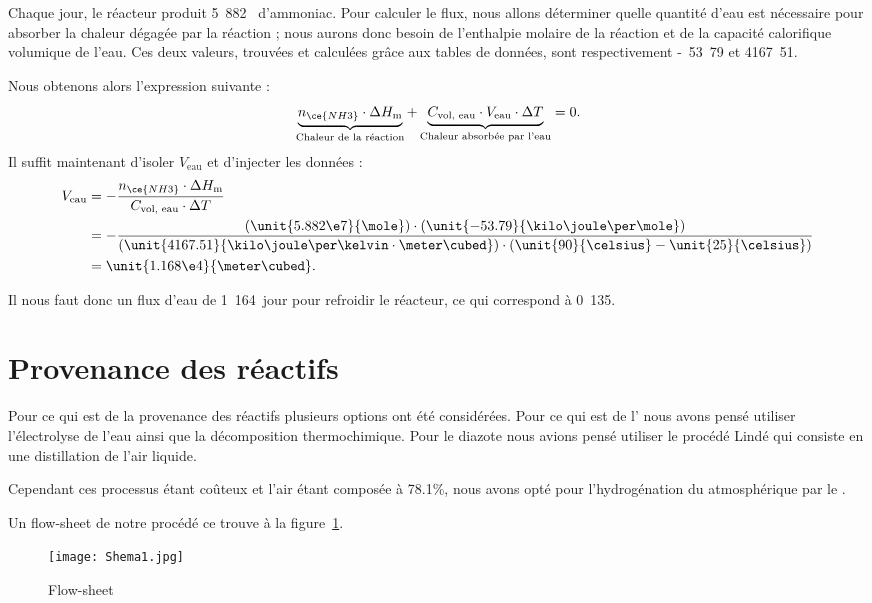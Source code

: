 Chaque jour, le réacteur produit \unit{5.882}{\mole} d'ammoniac. Pour calculer le flux, nous allons déterminer quelle quantité d'eau est nécessaire pour absorber la chaleur dégagée par la réaction ; nous aurons donc besoin de l'enthalpie molaire de la réaction et de la capacité calorifique volumique de l'eau. Ces deux valeurs, trouvées et calculées grâce aux tables de données, sont respectivement \unit{-53.79}{\kilo\joule\per\mole} et \unit{4167.51}{\kilo\joule\per\kelvin \cdot \meter\cubed}.

Nous obtenons alors l'expression suivante :
\[
  \underbrace{n_\ce{NH3} \cdot \Delta H_\text{m}}_{\text{Chaleur de la réaction}} + 
  \underbrace{C_\text{vol, eau} \cdot V_\text{eau} \cdot \Delta T}_{\text{Chaleur absorbée par l'eau}} = 0
  \text.
\]
Il suffit maintenant d'isoler $V_\text{eau}$ et d'injecter les données :
\begin{align*}
  V_\text{eau}
  &= - \frac{n_\ce{NH3} \cdot \Delta H_\text{m}}{C_\text{vol, eau} \cdot \Delta T} \\
  &= - \frac{(\unit{5.882\e7}{\mole}) \cdot (\unit{-53.79}{\kilo\joule\per\mole})}{(\unit{4167.51}{\kilo\joule\per\kelvin \cdot \meter\cubed}) \cdot (\unit{90}{\celsius} - \unit{25}{\celsius})} \\
  &= \unit{1.168\e4}{\meter\cubed}
  \text.
\end{align*}

Il nous faut donc un flux d'eau de \unit{1.164}{\meter\cubed\per jour} pour refroidir le réacteur, ce qui correspond à \unit{0.135}{\meter\cubed\per\second}.

\section{Provenance des réactifs}
 
Pour ce qui est de la provenance des réactifs plusieurs options ont été considérées. Pour ce qui est de l' nous avons pensé utiliser l'électrolyse de l'eau ainsi que la décomposition thermochimique. Pour le diazote nous avions pensé utiliser le procédé Lindé qui consiste en une distillation de l'air liquide.

Cependant ces processus étant coûteux et l'air étant composée à 78.1\%, nous avons opté pour l'hydrogénation du  atmosphérique par le . 

Un flow-sheet de notre procédé ce trouve à la figure~\ref{Flowsheet}.
\begin{figure}
  \begin{center}
 	 \texttt{[image: Shema1.jpg]}
  	 \caption{Flow-sheet}
  	 \label{Flowsheet}
  \end{center}
\end{figure}


%
